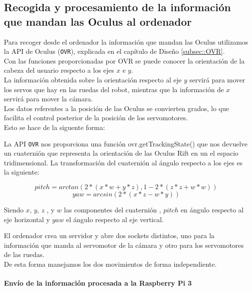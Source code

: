 \documentclass[twoside, 11pt]{epstfg}
\begin{document}
\subsection{Recogida y procesamiento de la información que mandan las Oculus al ordenador}

Para recoger desde el ordenador la información que mandan las Oculus utilizamos la API de Oculus (\texttt{OVR}), explicada en el capítulo de Diseño \ref{subsec::OVR}.\\
Con las funciones proporcionadas por OVR se puede conocer la orientación de la cabeza del usuario respecto a los ejes $x$ e $y$.\\
La información obtenida sobre la orientación respecto al eje $y$ servirá para mover los servos que hay en las ruedas del robot, mientras que la información de $x$ servirá para mover la cámara.\\
Los datos referentes a la posición de las Oculus se convierten grados, lo que facilita el control posterior de la posición de los servomotores.\\ Esto se hace de la siguente forma:

La API \texttt{OVR} nos proporciona una función  ovr.getTrackingState() que nos devuelve un cuaternión que representa la orientación de las Oculus Rift en un el espacio tridimensional. La transformación del cuaternión al ángulo respecto a los ejes es la siguiente:


$$  pitch = arctan(2 * (x*w + y*z), 1 - 2 * (z*z + w*w))$$
$$  yaw = arcsin(2 * (x*z - w*y))$$

Siendo $x$, $y$, $z$ , y $w$ las componentes del cuaternión , $pitch$ en ángulo respecto al eje horizontal y $yaw$ el ángulo respecto al eje vertical.

El ordenador crea un servidor y abre dos sockets distintos, uno para la información que manda al servomotor de la cámara y otro para los servomotores de las ruedas.\\
De esta forma manejamos los dos movimientos de forma independiente.



\paragraph{Envío de la información procesada a la Raspberry Pi 3}
\end{document}
